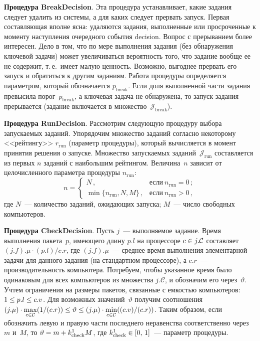 \begin{multicols}{2}
\textbf{Процедура {\sf BreakDecision}}. Эта процедура уста\-нав\-ли\-ва\-ет, какие 
задания следует удалить из системы, а для каких следует прервать запуск. 
Первая со\-став\-ля\-ющая вполне ясна: удаляются задания, выполненные или 
просроченные к моменту наступления очередного события decision. Вопрос 
с прерыванием более интересен. Дело в том, что по мере выполнения 
задания (без обнаружения ключевой задачи) может увеличиваться 
вероятность того, что задание вообще ее не содержит, т.\,е.\ имеет малую 
ценность. Возможно, выгоднее прервать его запуск и обратиться к другим 
заданиям. Работа процедуры определяется параметром, который 
обозначается $p_{\mathrm{break}}$. Если доля выполненной части задания 
превысила порог~$p_{\mathrm{break}}$, а ключевая задача не обнаружена, 
то запуск задания прерывается (задание включается в 
множество~$\mathcal{J}_{\mathrm{break}}$).
    
    \smallskip
    
\textbf{Процедура {\sf RunDecision}}. Рассмотрим сле\-ду\-ющую процедуру 
выбора запускаемых заданий. Упорядочим множество заданий согласно 
некоторому <<рейтингу>> $r_{\mathrm{run}}$ (параметр процедуры), 
который вычисляется в момент принятия решения о запуске. Множество 
запускаемых заданий~$\mathcal{J}_{\mathrm{run}}$ составляется из первых $n$ 
заданий с наибольшим рейтингом. Величина~$n$ зависит от 
целочисленного параметра процедуры $n_{\mathrm{run}}$:
    $$
    n=\begin{cases}
    N\,, & \mbox{если}\ n_{\mathrm{run}}=0\,;\\
    \min \{ n_{\mathrm{run}},N,M\}\,, & \mbox{если}\ n_{\mathrm{run}}>0\,,
    \end{cases}
    $$
где $N$~--- количество заданий, ожидающих запуска; $M$~--- чис\-ло 
свободных компьютеров.
    
    \smallskip
    
\textbf{Процедура {\sf CheckDecision}}. Пусть $j$~--- выполняемое задание. 
Время выполнения пакета~$p$, имеющего длину $p.l$ на процессоре 
$c\hm\in j.\mathcal{C}$ составляет $(j.f).\mu\cdot (p.l)/c.r$, где $(j.f).\mu$~--- среднее 
время выполнения элементарной задачи для данного задания (на 
стандартном процессоре), а $c.r$~--- производительность компьютера. 
Потребуем, чтобы указанное время было одинаковым для всех компьютеров 
из множества $j.\mathcal{C}$, и обозначим его через~$\vartheta$. Учтем ограничения 
на размеры пакетов, связанные с емкостью компьютеров: $1\hm\leq 
p.l\hm\leq c.v$. Для возможных значений~$\vartheta$ получим соотношения 
$(j.\mu)\cdot \max\limits_{c\in \mathcal{C}} (1/(c.r))\hm\leq \vartheta\hm\leq 
(j.\mu)\cdot \min\limits_{c\in \mathcal{C}}((c.v)/(c.r))$. Таким образом, если обозначить 
левую и правую части последнего неравенства соответственно через~$m$ 
и~$M$, то $\vartheta\hm= m+k^1_{\mathrm{check}}M$, где 
$k^1_{\mathrm{check}}\hm\in [0,\,1]$~--- параметр процедуры.
    

\end{multicols}
